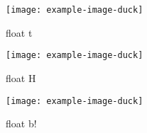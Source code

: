 \documentclass[a4paper]{article}
\begin{document}
\Blindtext[1]
\begin{figure}[t]
    \texttt{[image: example-image-duck]}
    \caption{float t}
\end{figure}
\Blindtext[1]
\clearpage
\Blindtext[1]
\begin{figure}[H]
    \texttt{[image: example-image-duck]}
    \caption{float H}
\end{figure}
\Blindtext[1]
\clearpage
\Blindtext[1]
\begin{figure}[b!]
    \texttt{[image: example-image-duck]}
    \caption{float b!}
\end{figure}
\Blindtext[1]
\end{document}
